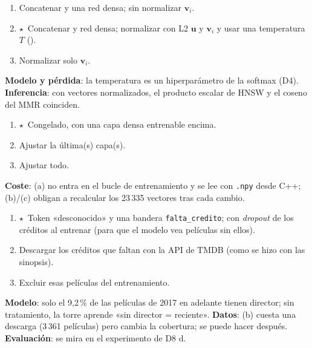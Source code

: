 \documentclass[a4paper,11pt]{article}
\newcommand{\rec}{\ensuremath{\star}}
\begin{document}
\begin{enumerate}[label=\alph*)]
  \item Concatenar y una red densa; sin normalizar $\mathbf v_i$.
  \item \rec\ Concatenar y red densa; normalizar con L2 $\mathbf u$ y $\mathbf v_i$ y usar una temperatura $T$ (\cite{yi2019}).
  \item Normalizar solo $\mathbf v_i$.
\end{enumerate}
\textbf{Modelo y pérdida}: la temperatura es un hiperparámetro de la softmax (D4). \textbf{Inferencia}: con vectores normalizados, el producto escalar de HNSW y el coseno del MMR coinciden.

\begin{enumerate}[label=\alph*)]
  \item \rec\ Congelado, con una capa densa entrenable encima.
  \item Ajustar la última(s) capa(s).
  \item Ajustar todo.
\end{enumerate}
\textbf{Coste}: (a) no entra en el bucle de entrenamiento y se lee con \texttt{.npy} desde C++; (b)/(c) obligan a recalcular los 23\,335 vectores tras cada cambio.
\afecta{---}

\begin{enumerate}[label=\alph*)]
  \item \rec\ Token «desconocido» y una bandera \texttt{falta\_credito}; con \emph{dropout} de los créditos al entrenar (para que el modelo vea películas sin ellos).
  \item Descargar los créditos que faltan con la API de TMDB (como se hizo con las sinopsis).
  \item Excluir esas películas del entrenamiento.
\end{enumerate}
\textbf{Modelo}: solo el 9,2\,\% de las películas de 2017 en adelante tienen director; sin tratamiento, la torre aprende «sin director = reciente». \textbf{Datos}: (b) cuesta una descarga
(3\,361 películas) pero cambia la cobertura; se puede hacer después. \textbf{Evaluación}: se mira en el experimento de D8 d.
\end{document}
